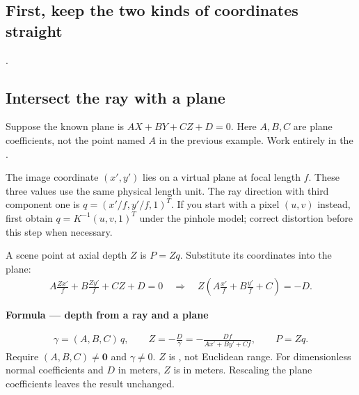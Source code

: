\documentclass[letterpaper,11pt,english,openany,oneside]{jupyterBook}
\begin{document}
\subsection{First, keep the two kinds of coordinates straight}
\label{\detokenize{lectures/lecture03/ray-plane:first-keep-the-two-kinds-of-coordinates-straight}}
\sphinxAtStartPar
{} {\hyperref[\detokenize{lectures/lecture03/quiz-workbook:quiz-14-q1}]{}}.


\subsection{Intersect the ray with a plane}
\label{\detokenize{lectures/lecture03/ray-plane:intersect-the-ray-with-a-plane}}
\ignorespaces
\sphinxAtStartPar
Suppose the known plane is \(AX+BY+CZ+D=0\). Here \(A,B,C\) are plane coefficients, not the point named \(A\) in the previous example. Work entirely in the .

\sphinxAtStartPar
The image coordinate \((x',y')\) lies on a virtual plane at focal length \(f\). These three values use the same physical length unit. The ray direction with third component one is
\(q=(x'/f,y'/f,1)^T\). If you start with a pixel \((u,v)\) instead, first obtain \(q=K^{-1}(u,v,1)^T\) under the pinhole model; correct distortion before this step when necessary.

\sphinxAtStartPar
A scene point at axial depth \(Z\) is \(P=Zq\). Substitute its coordinates into the plane:
\begin{equation*}
\begin{split}
A\frac{Zx'}f+B\frac{Zy'}f+CZ+D=0
\quad\Rightarrow\quad
Z\left(A\frac{x'}f+B\frac{y'}f+C\right)=-D.
\end{split}
\end{equation*}
\begin{TextbookBox}
\textbf{Formula — depth from a ray and a plane}\par\smallskip
\begin{equation}\label{equation:lectures/lecture03/ray-plane:eq-lec03-ray-plane}
\begin{split}\gamma=(A,B,C)\,q,\qquad
Z=-\frac{D}{\gamma}
 =-\frac{Df}{Ax'+By'+Cf},\qquad P=Zq.\end{split}
\end{equation}
\sphinxAtStartPar
Require \((A,B,C)\ne\mathbf0\) and \(\gamma\ne0\). \(Z\) is , not Euclidean range. For dimensionless normal coefficients and \(D\) in meters, \(Z\) is in meters. Rescaling the plane coefficients leaves the result unchanged.

\end{TextbookBox}
\end{document}
